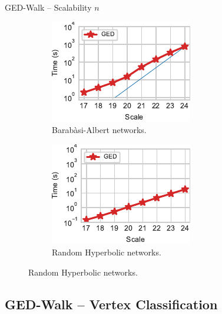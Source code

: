 \documentclass[10pt,titlepage,english,presentation]{beamer}
\begin{document}
\begin{frame}[t]{GED-Walk -- Scalability \wrt $n$}
\begin{figure}
\begin{subfigure}[t]{.5\textwidth}
\centering
\includegraphics[width=.7\textwidth]{../sources/plots/ged-walk/BA_scalability.pdf}
\caption*{\scriptsize Barab\`asi-Albert networks.}
\end{subfigure}\hfill
\begin{subfigure}[t]{.5\textwidth}
\centering
\includegraphics[width=.7\textwidth]{../sources/plots/ged-walk/RH_scalability.pdf}
\caption*{\scriptsize Random Hyperbolic networks.}
\end{subfigure}
\end{figure}
\end{frame}

\subsection{GED-Walk -- Vertex Classification}
\end{document}
